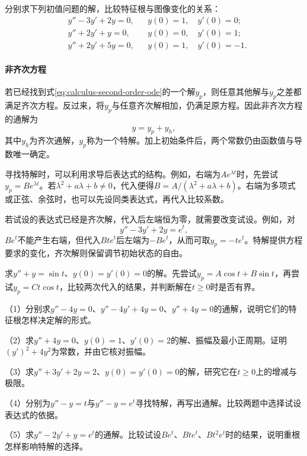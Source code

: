 \begin{example}
分别求下列初值问题的解，比较特征根与图像变化的关系：
\begin{equation*}
 \begin{aligned}
 &y''-3y'+2y=0,&&y(0)=1,\quad y'(0)=0;\\
 &y''+2y'+y=0,&&y(0)=0,\quad y'(0)=1;\\
 &y''+2y'+5y=0,&&y(0)=1,\quad y'(0)=-1.
 \end{aligned}
\end{equation*}
\end{example}

\paragraph{非齐次方程} \mbox{}

若已经找到式\eqref{eq:calculus-second-order-ode}的一个解\(y_p\)，则任意其他解与\(y_p\)之差都满足齐次方程。反过来，将\(y_p\)与任意齐次解相加，仍满足原方程。因此非齐次方程的通解为
\begin{equation*}
 y=y_p+y_h,
\end{equation*}
其中\(y_h\)为齐次通解，\(y_p\)称为一个{\heiti{}特解}。加上初始条件后，两个常数仍由函数值与导数唯一确定。

寻找特解时，可以利用求导后表达式的结构。例如，右端为\(Ae^{\lambda t}\)时，先尝试\(y_p=Be^{\lambda t}\)。若\(\lambda^2+a\lambda+b\ne0\)，代入便得\(B=A/(\lambda^2+a\lambda+b)\)。右端为多项式或正弦、余弦时，也可以先设同类表达式，再代入比较系数。

若试设的表达式已经是齐次解，代入后左端恒为零，就需要改变试设。例如，对
\begin{equation*}
 y''-3y'+2y=e^t,
\end{equation*}
\(Be^t\)不能产生右端，但代入\(Bte^t\)后左端为\(-Be^t\)，从而可取\(y_p=-te^t\)。特解提供方程要求的变化，齐次解则保留调节初始状态的自由。

\begin{example}
求\(y''+y=\sin t\)、\(y(0)=y'(0)=0\)的解。先尝试\(y_p=A\cos t+B\sin t\)，再尝试\(y_p=Ct\cos t\)，比较两次代入的结果，并判断解在\(t\ge0\)时是否有界。
\end{example}

\begin{exercise}
\mbox{}\par\nobreak

（1）分别求\(y''-4y=0\)、\(y''-4y'+4y=0\)、\(y''+4y=0\)的通解，说明它们的特征根怎样决定解的形式。

（2）求\(y''+4y=0\)、\(y(0)=1\)、\(y'(0)=2\)的解、振幅及最小正周期。证明\((y')^2+4y^2\)为常数，并由它核对振幅。

（3）求\(y''+3y'+2y=2\)、\(y(0)=y'(0)=0\)的解，研究它在\(t\ge0\)上的增减与极限。

（4）分别为\(y''-y=t\)与\(y''-y=e^t\)寻找特解，再写出通解。比较两题中选择试设表达式的依据。

（5）求\(y''-2y'+y=e^t\)的通解。比较试设\(Be^t\)、\(Bte^t\)、\(Bt^2e^t\)时的结果，说明重根怎样影响特解的选择。
\end{exercise}

